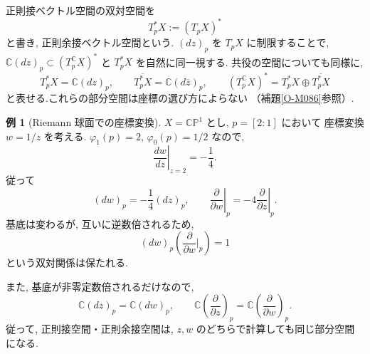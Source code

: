 \documentclass[dvipdfmx,a4paper,11pt]{article} %
\newcommand{\C}{\mathbb{C}}
\theoremstyle{definition}
\numberwithin{equation}{section}
\newtheorem{exa}[thm]{例}
\begin{document}
正則接ベクトル空間の双対空間を
\[
T_p^*X:=(T_pX)^*
\]
と書き, 正則余接ベクトル空間という.
$(dz)_p$ を $T_pX$ に制限することで,
$\C(dz)_p\subset(T_p^\C X)^*$ と $T_p^*X$ を自然に同一視する.
共役の空間についても同様に,
\[
T_p^*X=\C(dz)_p,\qquad
\overline{T_p^*X}=\C(d\overline z)_p,\qquad
(T_p^\C X)^*=T_p^*X\oplus\overline{T_p^*X}
\]
と表せる.これらの部分空間は座標の選び方によらない
（補題\ref{O-M086}参照）.

\begin{exa}[Riemann 球面での座標変換]
$X=\C\mathbb P^1$ とし, $p=[2:1]$ において
座標変換 $w=1/z$ を考える.
$\varphi_1(p)=2$, $\varphi_0(p)=1/2$ なので,
\[
\left.\frac{dw}{dz}\right|_{z=2}=-\frac14.
\]
従って
\[
(dw)_p=-\frac14(dz)_p,\qquad
\left.\frac{\partial}{\partial w}\right|_p
=-4\left.\frac{\partial}{\partial z}\right|_p.
\]
基底は変わるが, 互いに逆数倍されるため,
\[
(dw)_p\left(\frac{\partial}{\partial w}\Big|_p\right)=1
\]
という双対関係は保たれる.

また, 基底が非零定数倍されるだけなので, 
\[
\C(dz)_p=\C(dw)_p,\qquad
\C\left(\frac{\partial}{\partial z}\right)_p
=\C\left(\frac{\partial}{\partial w}\right)_p.
\]
従って, 正則接空間・正則余接空間は, 
$z,w$ のどちらで計算しても同じ部分空間になる.
\end{exa}
\end{document}
